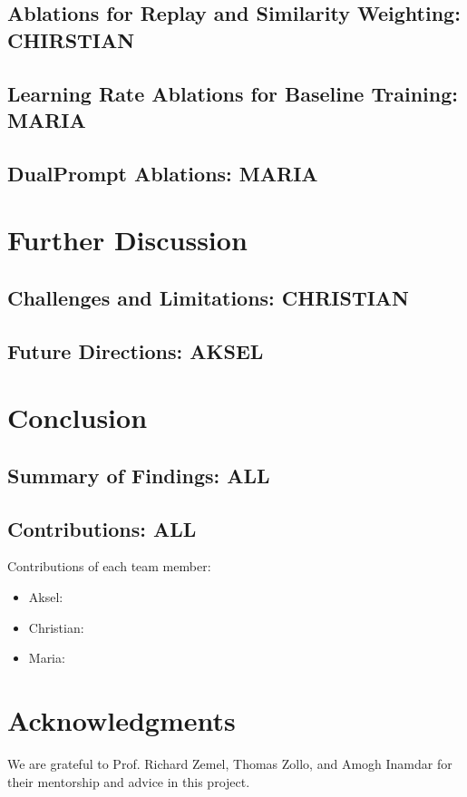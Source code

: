 \documentclass{article}
\begin{document}
\subsection{Ablations for Replay and Similarity Weighting: CHIRSTIAN}

\subsection{Learning Rate Ablations for Baseline Training: MARIA}

\subsection{DualPrompt Ablations: MARIA}

\section{Further Discussion}

\subsection{Challenges and Limitations: CHRISTIAN}

\subsection{Future Directions: AKSEL}

\section{Conclusion}

\subsection{Summary of Findings: ALL}

\subsection{Contributions: ALL}

Contributions of each team member:
\begin{itemize}
		\item Aksel:
		\item Christian:
		\item Maria:
\end{itemize}

\section*{Acknowledgments}
We are grateful to Prof. Richard Zemel, Thomas Zollo, and Amogh Inamdar for their mentorship and advice in this project.
\end{document}
